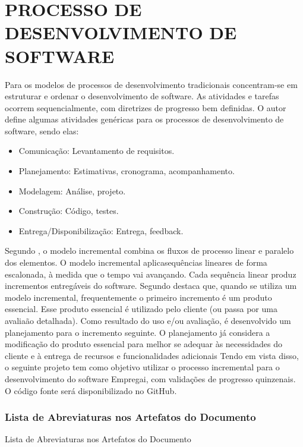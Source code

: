 \chapter{PROCESSO DE DESENVOLVIMENTO DE SOFTWARE}\label{cap:desenvolvimento}
Para \textcite{Pressman2016} os modelos de processos de desenvolvimento 
tradicionais concentram-se em estruturar e ordenar o desenvolvimento de software. As 
atividades e tarefas ocorrem sequencialmente, com diretrizes de progresso bem 
definidas. O autor define algumas atividades genéricas para os processos de 
desenvolvimento de software, sendo elas:
\begin{itemize}[label=$\bullet$]
	\item Comunicação: Levantamento de requisitos.
	\item Planejamento: Estimativas, cronograma, acompanhamento.
	\item Modelagem: Análise, projeto.
	\item Construção: Código, testes.
	\item Entrega/Disponibilização: Entrega, feedback.
	\end{itemize}
	Segundo \textcite{Pressman2016}, o modelo incremental combina os fluxos de processo linear
	e paralelo dos elementos. O modelo incremental aplicasequências lineares de
	forma escalonada, à medida que o tempo vai avançando. Cada sequência linear
	produz incrementos entregáveis do software. \newline
	Segundo \textcite{Pressman2016} destaca que, quando se utiliza um modelo incremental,
	frequentemente o primeiro incremento é um produto essencial. Esse 
	produto essencial é utilizado pelo cliente (ou passa por uma avaliaão detalhada). Como 
	resultado do uso e/ou avaliação, é desenvolvido um planejamento para o incremento
	seguinte. O planejamento já considera a modificação do produto essencial para melhor 
	se adequar às necessidades do cliente e à entrega de recursos e funcionalidades 
	adicionais
	Tendo em vista disso, o seguinte projeto tem como objetivo utilizar o processo 
	incremental para o desenvolvimento do software Empregai, com validações de 
	progresso quinzenais. O código fonte será disponibilizado no GitHub.

\subsection{Lista de Abreviaturas nos Artefatos do Documento}
Lista de Abreviaturas nos Artefatos do Documento
